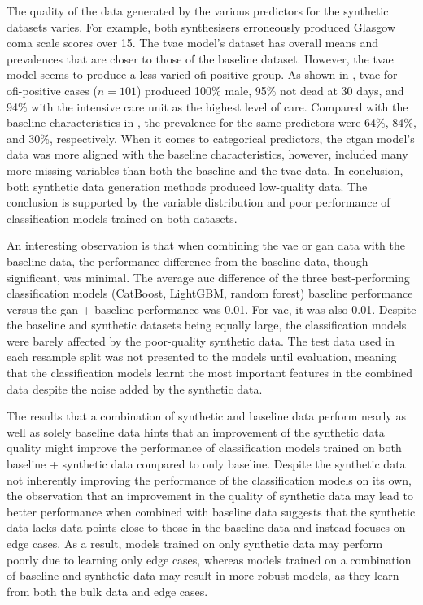 \documentclass[12pt, a4paper]{article}
\begin{document}
The quality of the data generated by the various predictors for the synthetic datasets varies. For example, both
synthesisers erroneously produced Glasgow coma scale scores over 15. The \acrshort{tvae} model's dataset has overall
means and prevalences that are closer to those of the baseline dataset. However, the \acrshort{tvae} model seems to
produce a less varied \acrshort{ofi}-positive group. As shown in , \acrshort{tvae} for
\acrshort{ofi}-positive cases ($n=101$) produced 100\% male, 95\% not dead at 30 days, and 94\% with the intensive care
unit as the highest level of care. Compared with the baseline characteristics in , the prevalence
for the same predictors were 64\%, 84\%, and 30\%, respectively. When it comes to categorical predictors, the
\acrshort{ctgan} model's data was more aligned with the baseline characteristics, however, included many more missing
variables than both the baseline and the \acrshort{tvae} data. In conclusion, both synthetic data generation methods
produced low-quality data. The conclusion is supported by the variable distribution and poor performance of
classification models trained on both datasets.

An interesting observation is that when combining the \acrshort{vae} or \acrshort{gan} data with the baseline data, the
performance difference from the baseline data, though significant, was minimal. The average \acrshort{auc} difference
of the three best-performing classification models (CatBoost, LightGBM, random forest) baseline performance versus the
\acrshort{gan} + baseline performance was 0.01. For \acrshort{vae}, it was also 0.01. Despite the baseline and
synthetic datasets being equally large, the classification models were barely affected by the poor-quality synthetic
data. The test data used in each resample split was not presented to the models until evaluation, meaning that the
classification models learnt the most important features in the combined data despite the noise added by the synthetic
data.

The results that a combination of synthetic and baseline data perform nearly as well as solely baseline data hints that
an improvement of the synthetic data quality might improve the performance of classification models trained on both
baseline + synthetic data compared to only baseline. Despite the synthetic data not inherently improving the
performance of the classification models on its own, the observation that an improvement in the quality of synthetic
data may lead to better performance when combined with baseline data suggests that the synthetic data lacks data points
close to those in the baseline data and instead focuses on edge cases. As a result, models trained on only synthetic
data may perform poorly due to learning only edge cases, whereas models trained on a combination of baseline and
synthetic data may result in more robust models, as they learn from both the bulk data and edge cases.
\end{document}
